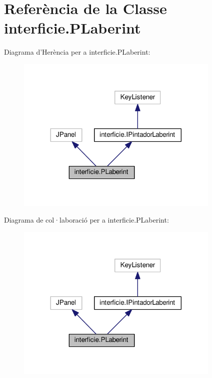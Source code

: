 \hypertarget{classinterficie_1_1_p_laberint}{\section{Referència de la Classe interficie.\+P\+Laberint}
\label{classinterficie_1_1_p_laberint}
}


Diagrama d'Herència per a interficie.\+P\+Laberint\+:\nopagebreak
\begin{figure}[H]
\begin{center}
\leavevmode
\includegraphics[width=276pt]{classinterficie_1_1_p_laberint__inherit__graph}
\end{center}
\end{figure}


Diagrama de col·laboració per a interficie.\+P\+Laberint\+:\nopagebreak
\begin{figure}[H]
\begin{center}
\leavevmode
\includegraphics[width=276pt]{classinterficie_1_1_p_laberint__coll__graph}
\end{center}
\end{figure}
